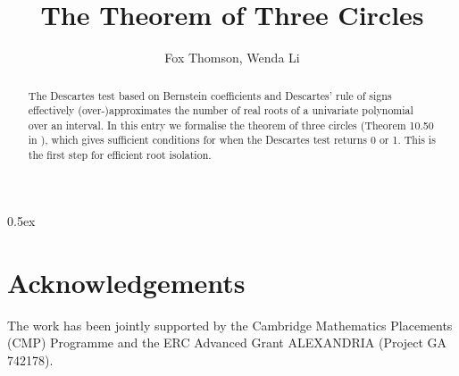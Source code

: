 \documentclass[11pt,a4paper]{article}
\begin{document}
\title{The Theorem of Three Circles}
\author{Fox Thomson, Wenda Li}
\maketitle


\begin{abstract}
  The Descartes test based on Bernstein coefficients and Descartes' rule of signs 
  effectively (over-)approximates the number of real roots of a univariate polynomial over 
  an interval. In this entry we formalise the theorem of three circles (Theorem 10.50 in \cite{Basu:2016bo}), 
	which gives sufficient conditions for when the Descartes test 
	returns 0 or 1. This is the first step for efficient root isolation.
\end{abstract}

\tableofcontents


\parindent 0pt\parskip 0.5ex




\section{Acknowledgements}

The work has been jointly supported by the Cambridge Mathematics Placements (CMP) 
Programme and the ERC Advanced Grant ALEXANDRIA (Project GA 742178).



\end{document}
